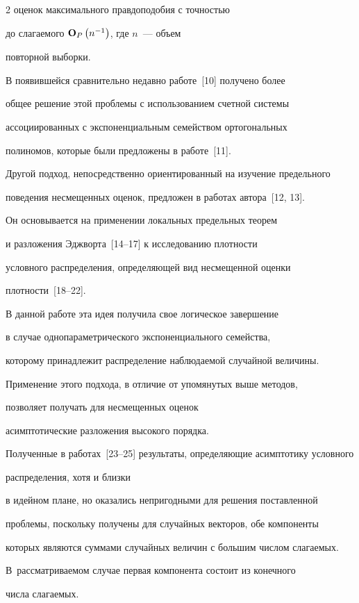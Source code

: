 \begin{multicols}{2}
  оценок максимального правдоподобия с точностью


  до слагаемого ${\bf O}_P\left( n^{-1}\right)$, где $n$~--- объем


  повторной выборки.


   В появившейся сравнительно недавно работе~[10] получено более


  общее решение этой проблемы с использованием счетной системы


  ассоциированных с экспоненциальным семейством ортогональных


  полиномов, которые были предложены в работе~[11].


   Другой подход, непосредственно ориентированный на изучение предельного


  поведения несмещенных оценок, предложен в работах автора~[12, 13].


  Он основывается на применении локальных предельных теорем


  и разложения Эджворта~[14--17] к исследованию плотности


  условного распределения, определяющей вид несмещенной оценки


  плотности~[18--22].


   В данной работе эта идея получила свое логическое завершение


  в случае однопараметрического экспоненциального семейства,


  которому принадлежит распределение наблюдаемой случайной величины.\linebreak


   Применение этого подхода, в отличие от упомянутых выше методов,


  позволяет получать для несмещенных оценок


  асимптотические разложения высокого порядка.


   Полученные в работах~[23--25] результаты, определяющие асимптотику условного


  распределения, хотя и близки


  в идейном плане, но оказались непригодными для решения поставленной


  проблемы, поскольку получены для случайных векторов, обе компоненты


  которых являются суммами случайных величин с большим числом слагаемых.


  В~рассматриваемом случае первая компонента состоит из конечного


  числа слагаемых.



\end{multicols}
